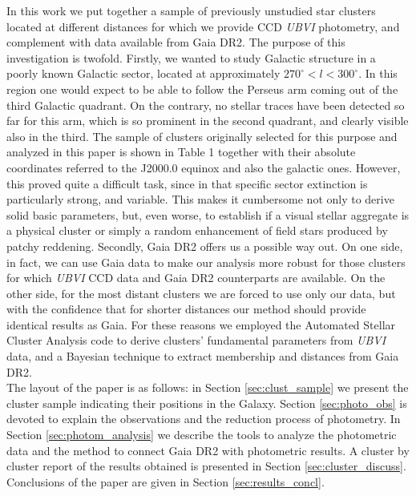 \documentclass{aa}
\begin{document}
In this work we put together a sample of previously unstudied star clusters
located at different distances for which we provide CCD \textit{UBVI}
photometry, and complement with data available from Gaia DR2. The purpose of
this investigation is twofold. Firstly, we wanted to study Galactic structure in
a poorly known Galactic sector, located at approximately $270^\circ < l <
300^\circ$. In this region one would expect to be able to follow the Perseus arm
coming out of the third Galactic quadrant. On the contrary, no stellar traces
have been detected so far for this arm, which is so prominent in the second
quadrant, and clearly visible also in the third. The sample of clusters
originally selected for this purpose and analyzed in this paper is shown in
Table 1 together with their absolute coordinates referred to the J2000.0 equinox
and also the galactic ones. However, this proved quite a difficult task, since
in that specific sector extinction is particularly strong, and variable. This
makes it cumbersome not only to derive solid basic parameters, but, even worse,
to establish if a visual stellar aggregate is a physical cluster or simply a
random enhancement of field stars produced by patchy reddening.
Secondly, Gaia DR2 offers us a possible way out. On one side, in fact, we can
use Gaia data to make our analysis more robust for those clusters for which
\textit{UBVI} CCD data and Gaia DR2 counterparts are available. On the other
side, for the most distant clusters we are forced to use only our data, but with
the confidence that for shorter distances our method should provide identical
results as Gaia. For these reasons we employed the Automated Stellar
Cluster Analysis code \citep[\texttt{ASteCA};][]{Perren_2015} to derive
clusters' fundamental parameters from \textit{UBVI} data, and a Bayesian
technique to extract membership and distances from Gaia DR2.\\

The layout of the paper is as follows: in Section \ref{sec:clust_sample} we
present the cluster sample indicating their positions in the Galaxy.
Section \ref{sec:photo_obs} is devoted to explain the observations and the
reduction process of photometry. In Section \ref{sec:photom_analysis} we
describe the tools to analyze the photometric data and the method to connect
Gaia DR2 with photometric results. A cluster by cluster report of the results
obtained is presented in Section \ref{sec:cluster_discuss}.
Conclusions of the paper are given in Section \ref{sec:results_concl}.
\end{document}
